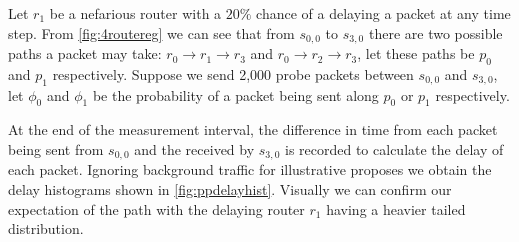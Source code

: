 Let $r_1$ be a nefarious router with a $20\%$ chance of a delaying a packet at any time step. From \ref{fig:4routereg} we can see that from $s_{0,0}$ to $s_{3,0}$ there are two possible paths a packet may take: $r_0\rightarrow r_1\rightarrow r_3$ and $r_0\rightarrow r_2\rightarrow r_3$, let these paths be $p_0$ and $p_1$ respectively. Suppose we send 2,000 probe packets between $s_{0,0}$ and $s_{3,0}$, let $\phi_0$ and $\phi_1$ be the probability of a packet being sent along $p_0$ or $p_1$ respectively.\par
At the end of the measurement interval, the difference in time from each packet being sent from $s_{0,0}$ and the received by $s_{3,0}$ is recorded to calculate the delay of each packet. Ignoring background traffic for illustrative proposes we obtain the delay histograms shown in \cref{fig:ppdelayhist}. Visually we can confirm our expectation of the path with the delaying router $r_1$ having a heavier tailed distribution.\par
